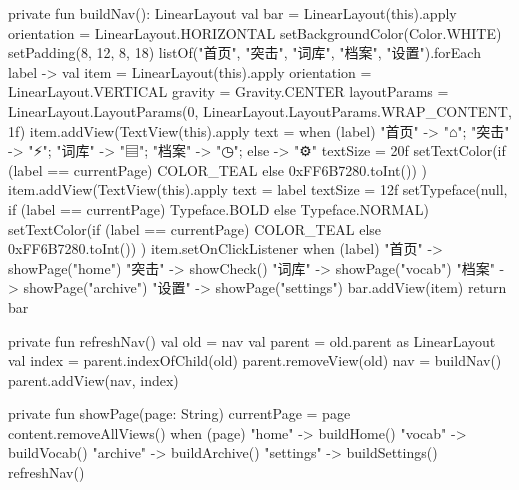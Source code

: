 {    private fun buildNav(): LinearLayout {
        val bar = LinearLayout(this).apply {
            orientation = LinearLayout.HORIZONTAL
            setBackgroundColor(Color.WHITE)
            setPadding(8, 12, 8, 18)
        }
        listOf("首页", "突击", "词库", "档案", "设置").forEach { label ->
            val item = LinearLayout(this).apply {
                orientation = LinearLayout.VERTICAL
                gravity = Gravity.CENTER
                layoutParams = LinearLayout.LayoutParams(0, LinearLayout.LayoutParams.WRAP_CONTENT, 1f)
            }
            item.addView(TextView(this).apply {
                text = when (label) {
                    "首页" -> "⌂"; "突击" -> "⚡"; "词库" -> "▤"; "档案" -> "◷"; else -> "⚙"
                }
                textSize = 20f
                setTextColor(if (label == currentPage) COLOR_TEAL else 0xFF6B7280.toInt())
            })
            item.addView(TextView(this).apply {
                text = label
                textSize = 12f
                setTypeface(null, if (label == currentPage) Typeface.BOLD else Typeface.NORMAL)
                setTextColor(if (label == currentPage) COLOR_TEAL else 0xFF6B7280.toInt())
            })
            item.setOnClickListener {
                when (label) {
                    "首页" -> showPage("home")
                    "突击" -> showCheck()
                    "词库" -> showPage("vocab")
                    "档案" -> showPage("archive")
                    "设置" -> showPage("settings")
                }
            }
            bar.addView(item)
        }
        return bar
    }

    private fun refreshNav() {
        val old = nav
        val parent = old.parent as LinearLayout
        val index = parent.indexOfChild(old)
        parent.removeView(old)
        nav = buildNav()
        parent.addView(nav, index)
    }

    private fun showPage(page: String) {
        currentPage = page
        content.removeAllViews()
        when (page) {
            "home" -> buildHome()
            "vocab" -> buildVocab()
            "archive" -> buildArchive()
            "settings" -> buildSettings()
        }
        refreshNav()
    }

}
